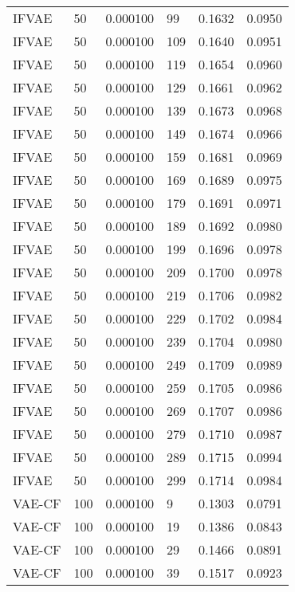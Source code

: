 \begin{tabular}{llrlrr}
   IFVAE &   50 &  0.000100 &    99 &  0.1632 &       0.0950 \\
   IFVAE &   50 &  0.000100 &   109 &  0.1640 &       0.0951 \\
   IFVAE &   50 &  0.000100 &   119 &  0.1654 &       0.0960 \\
   IFVAE &   50 &  0.000100 &   129 &  0.1661 &       0.0962 \\
   IFVAE &   50 &  0.000100 &   139 &  0.1673 &       0.0968 \\
   IFVAE &   50 &  0.000100 &   149 &  0.1674 &       0.0966 \\
   IFVAE &   50 &  0.000100 &   159 &  0.1681 &       0.0969 \\
   IFVAE &   50 &  0.000100 &   169 &  0.1689 &       0.0975 \\
   IFVAE &   50 &  0.000100 &   179 &  0.1691 &       0.0971 \\
   IFVAE &   50 &  0.000100 &   189 &  0.1692 &       0.0980 \\
   IFVAE &   50 &  0.000100 &   199 &  0.1696 &       0.0978 \\
   IFVAE &   50 &  0.000100 &   209 &  0.1700 &       0.0978 \\
   IFVAE &   50 &  0.000100 &   219 &  0.1706 &       0.0982 \\
   IFVAE &   50 &  0.000100 &   229 &  0.1702 &       0.0984 \\
   IFVAE &   50 &  0.000100 &   239 &  0.1704 &       0.0980 \\
   IFVAE &   50 &  0.000100 &   249 &  0.1709 &       0.0989 \\
   IFVAE &   50 &  0.000100 &   259 &  0.1705 &       0.0986 \\
   IFVAE &   50 &  0.000100 &   269 &  0.1707 &       0.0986 \\
   IFVAE &   50 &  0.000100 &   279 &  0.1710 &       0.0987 \\
   IFVAE &   50 &  0.000100 &   289 &  0.1715 &       0.0994 \\
   IFVAE &   50 &  0.000100 &   299 &  0.1714 &       0.0984 \\
  VAE-CF &  100 &  0.000100 &     9 &  0.1303 &       0.0791 \\
  VAE-CF &  100 &  0.000100 &    19 &  0.1386 &       0.0843 \\
  VAE-CF &  100 &  0.000100 &    29 &  0.1466 &       0.0891 \\
  VAE-CF &  100 &  0.000100 &    39 &  0.1517 &       0.0923 \\

\end{tabular}
